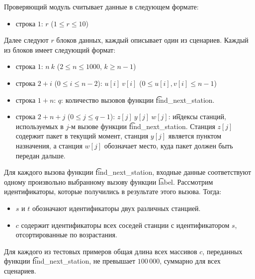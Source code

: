 Проверяющий модуль считывает данные в следующем формате:
\begin{itemize}
\item строка $1$: $r$ ($1 \leq r \leq 10$)
\end{itemize}

Далее следуют $r$ блоков данных, каждый описывает один из сценариев. Каждый из блоков имеет следующий формат:
\begin{itemize}
\item строка $1$: $n\ k$ ($2 \leq n \leq 1000$, $k \geq n-1$)
\item строка $2+i$ ($0 \leq i \leq n - 2$): $u[i]\ v[i]$ ($0 \leq u[i], v[i] \leq n - 1$)
\item строка $1 + n$: $q$: количество вызовов функции \t{find\_next\_station}.
\item строка $2 + n + j$ ($0 \leq j \leq q - 1$): $z[j]\ y[j]\ w[j]$: \t{индексы} станций, используемых в $j$-м вызове функции  \t{find\_next\_station}. Станция $z[j]$ содержит пакет в текущий момент, станция $y[j]$ является пунктом назначения, а станция $w[j]$ обозначает место, куда пакет должен быть передан дальше.
\end{itemize}

Для каждого вызова функции \t{find\_next\_station}, входные данные соответствуют одному произвольно выбранному вызову функции \t{label}. Рассмотрим идентификаторы, которые получились в результате этого вызова. Тогда:
\begin{itemize}
\item $s$ и $t$ обозначают идентификаторы двух различных станцией.
\item $c$ содержит идентификаторы всех соседей станции с идентификатором $s$, отсортированные по возрастания.
\end{itemize}

Для каждого из тестовых примеров общая длина всех массивов $c$, переданных функции \t{find\_next\_station}, не превышает $100\,000$, суммарно для всех сценариев.